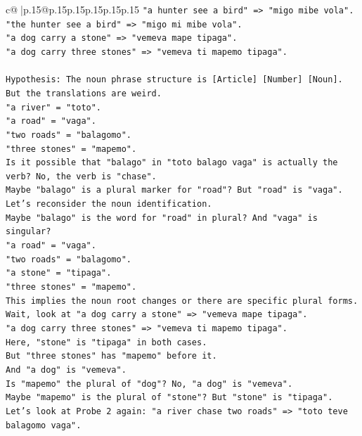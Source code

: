 \documentclass{article}
\begin{document}
{\begin{supertabular}{c@{$\;$}|p{.15\linewidth}@{}p{.15\linewidth}p{.15\linewidth}p{.15\linewidth}p{.15\linewidth}p{.15\linewidth}}
{{{\texttt{"a hunter see a bird" => "migo mibe vola".} \\
\texttt{"the hunter see a bird" => "migo mi mibe vola".} \\
\texttt{"a dog carry a stone" => "vemeva mape tipaga".} \\
\texttt{"a dog carry three stones" => "vemeva ti mapemo tipaga".} \\
\\ 
\texttt{Hypothesis: The noun phrase structure is {[}Article{]} {[}Number{]} {[}Noun{]}.} \\
\texttt{But the translations are weird.} \\
\texttt{"a river" = "toto".} \\
\texttt{"a road" = "vaga".} \\
\texttt{"two roads" = "balagomo".} \\
\texttt{"three stones" = "mapemo".} \\
\texttt{Is it possible that "balago" in "toto balago vaga" is actually the verb? No, the verb is "chase".} \\
\texttt{Maybe "balago" is a plural marker for "road"? But "road" is "vaga".} \\
\texttt{Let's reconsider the noun identification.} \\
\texttt{Maybe "balago" is the word for "road" in plural? And "vaga" is singular?} \\
\texttt{"a road" = "vaga".} \\
\texttt{"two roads" = "balagomo".} \\
\texttt{"a stone" = "tipaga".} \\
\texttt{"three stones" = "mapemo".} \\
\texttt{This implies the noun root changes or there are specific plural forms.} \\
\texttt{Wait, look at "a dog carry a stone" => "vemeva mape tipaga".} \\
\texttt{"a dog carry three stones" => "vemeva ti mapemo tipaga".} \\
\texttt{Here, "stone" is "tipaga" in both cases.} \\
\texttt{But "three stones" has "mapemo" before it.} \\
\texttt{And "a dog" is "vemeva".} \\
\texttt{Is "mapemo" the plural of "dog"? No, "a dog" is "vemeva".} \\
\texttt{Maybe "mapemo" is the plural of "stone"? But "stone" is "tipaga".} \\
\texttt{Let's look at Probe 2 again: "a river chase two roads" => "toto teve balagomo vaga".} \\
}}}
\end{supertabular}}
\end{document}
